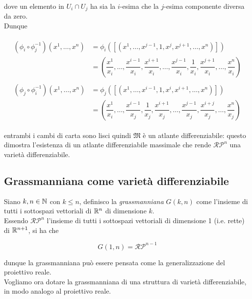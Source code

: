 dove un elemento in $ U_{i} \cap U_{j} $ ha sia la $ i $-esima che la $ j $-esima componente diversa da zero.\\
Dunque

\begin{align}
	\begin{split}
		(\phi_{i} \circ \phi_{j}^{-1})(x^{1},\dots,x^{n}) &= \phi_{i}([(x^{1},\dots,x^{j-1},1,x^{j},x^{j+1},\dots,x^{n})])\\
		&= \left( \dfrac{x^{1}}{x_{i}}, \dots, \dfrac{x^{i-1}}{x_{i}}, \dfrac{x^{i+1}}{x_{i}}, \dots, \dfrac{x^{j-1}}{x_{i}}, \dfrac{1}{x_{i}}, \dfrac{x^{j+1}}{x_{i}}, \dots, \dfrac{x^{n}}{x_{i}} \right)\\\\
		(\phi_{j} \circ \phi_{i}^{-1})(x^{1},\dots,x^{n}) &= \phi_{j}([(x^{1},\dots,x^{i-1},1,x^{i},x^{i+1},\dots,x^{n})])\\
		&= \left( \dfrac{x^{1}}{x_{i}}, \dots, \dfrac{x^{i-1}}{x_{j}}, \dfrac{1}{x_{j}}, \dfrac{x^{i+1}}{x_{j}}, \dots, \dfrac{x^{j-1}}{x_{j}}, \dfrac{x^{i+j}}{x_{j}}, \dots, \dfrac{x^{n}}{x_{j}} \right)
	\end{split}
\end{align}

entrambi i cambi di carta sono lisci quindi $ \mathfrak{M} $ è un atlante differenziabile: questo dimostra l'esistenza di un atlante differenziabile massimale che rende $ \mathcal{RP}^{n} $ una varietà differenziabile.

\subsection{Grassmanniana come varietà differenziabile}

Siano $ k,n \in \mathbb{N} $ con $ k \leqslant n $, definisco la \textit{grassmanniana} $ G(k,n) $ come l'insieme di tutti i sottospazi vettoriali di $ \mathbb{R}^{n} $ di dimensione $ k $.\\
Essendo $ \mathcal{RP}^{n} $ l'insieme di tutti i sottospazi vettoriali di dimensione 1 (i.e. rette) di $ \mathbb{R}^{n+1} $, si ha che

\begin{equation}
	G(1,n) = \mathcal{RP}^{n-1}
\end{equation}

dunque la grassmanniana può essere pensata come la generalizzazione del proiettivo reale.\\
Vogliamo ora dotare la grassmanniana di una struttura di varietà differenziabile, in modo analogo al proiettivo reale.

